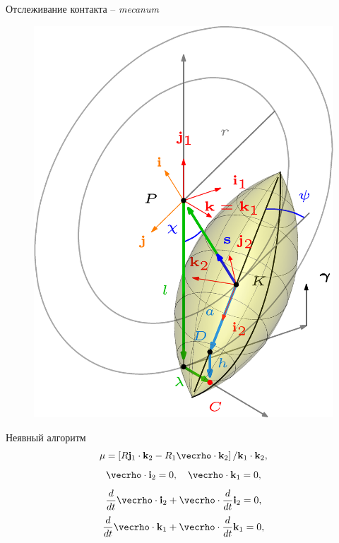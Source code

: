 \begin{frame}{Отслеживание контакта -- \textit{mecanum}}
        \begin{figure}[htb]
            \centering\includegraphics[width=\textwidth]{content/pic/asy/pic_mecanum.png}
            \label{ContactScheme}
        \end{figure}
    \endminipage
    \quad
        Неявный алгоритм
        $$
        \mu =\left[R{\bf j}_1\cdot{\bf k}_2-R_1{\vecrho }\cdot {\bf k}_2\right] /
        {\bf k}_1\cdot{\bf k}_2,
        $$
        $$
        \vecrho\cdot {\bf i}_2=0,\quad\vecrho\cdot {\bf k}_1=0,
        $$
        $$
        \dfrac{d}{dt}\vecrho\cdot {\bf i}_2+\vecrho\cdot\dfrac{d}{dt}{\bf i}_2=0,
        $$
        $$
        \dfrac{d}{dt}\vecrho\cdot {\bf k}_1+\vecrho\cdot\dfrac{d}{dt}{\bf k}_1=0,
        $$
    \endminipage
\end{frame}

